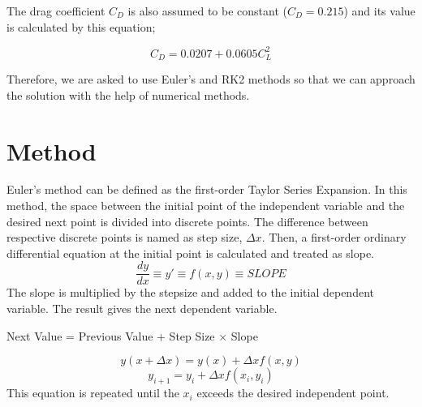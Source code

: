 \documentclass[letterpaper,12pt]{article}
\begin{document}
The drag coefficient $C_D$ is also assumed to be constant ($C_D = 0.215$) and its value is 
calculated by this equation;

\begin{equation}
        C_D = 0.0207 + 0.0605C_L^{2}
\end{equation}
        
Therefore, we are asked to use Euler's and RK2 methods so that we can approach the
solution with the help of numerical methods.


\section{Method}
Euler's method can be defined as the first-order Taylor Series Expansion. In this method, the space between
the initial point of the independent variable and the desired next point is divided into discrete points. The 
difference between respective discrete points is named as step size, $\Delta x$. Then, a first-order ordinary
differential equation at the initial point is calculated and treated as slope.
\begin{equation}
\frac{dy}{dx} \equiv y \prime \equiv f(x,y) \equiv SLOPE
\end{equation}
The slope is multiplied by the stepsize
and added to the initial dependent variable. The result gives the next dependent variable.

\begin{center}
Next Value = Previous Value + Step Size $\times $ Slope
\end{center}
\begin{equation}
y(x + \Delta x ) = y(x) + \Delta x f(x,y)
\end{equation}
\begin{equation}
y_{i+1} = y_i + \Delta x f(x_i , y_i)
\label{eq:eul}
\end{equation}
This equation is repeated until the $x_i$ exceeds the desired independent point.
\end{document}
